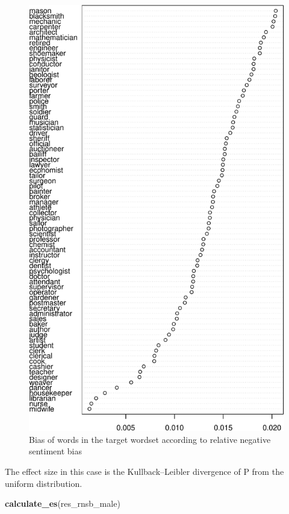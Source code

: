 \documentclass[english,man]{apa6}
\newenvironment{Shaded}{\begin{snugshade}}{\end{snugshade}}
\newcommand{\KeywordTok}[1]{\textcolor[rgb]{0.13,0.29,0.53}{\textbf{#1}}}
\newcommand{\NormalTok}[1]{#1}
\begin{document}
\begin{figure}
\centering
\includegraphics{ica_files/figure-latex/rnsb-1.pdf}
\caption{\label{fig:rnsb}Bias of words in the target wordset according to relative negative sentiment bias}
\end{figure}

The effect size in this case is the Kullback--Leibler divergence of P from the uniform distribution.

\begin{Shaded}
\begin{Highlighting}[]
\KeywordTok{calculate_es}\NormalTok{(res_rnsb_male)}
\end{Highlighting}
\end{Shaded}
\end{document}
